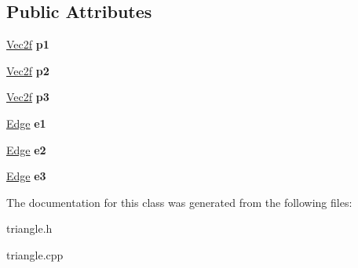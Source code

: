 \subsection*{Public Attributes}
\begin{DoxyCompactItemize}
\item 
\hyperlink{class_vector2}{Vec2f} {\bfseries p1}\hypertarget{class_triangle_af2ff757f1bff3177e1a0e8c19664edbc}{}\label{class_triangle_af2ff757f1bff3177e1a0e8c19664edbc}

\item 
\hyperlink{class_vector2}{Vec2f} {\bfseries p2}\hypertarget{class_triangle_a6a7d000238fb26c47181de1e7a502037}{}\label{class_triangle_a6a7d000238fb26c47181de1e7a502037}

\item 
\hyperlink{class_vector2}{Vec2f} {\bfseries p3}\hypertarget{class_triangle_a43b6750934c84aff2f34b38d2f26d012}{}\label{class_triangle_a43b6750934c84aff2f34b38d2f26d012}

\item 
\hyperlink{class_edge}{Edge} {\bfseries e1}\hypertarget{class_triangle_ab91aa48d8a4c25deecd1a35433a38260}{}\label{class_triangle_ab91aa48d8a4c25deecd1a35433a38260}

\item 
\hyperlink{class_edge}{Edge} {\bfseries e2}\hypertarget{class_triangle_a5ad4339f6fb03adb4f6ee840ace34d82}{}\label{class_triangle_a5ad4339f6fb03adb4f6ee840ace34d82}

\item 
\hyperlink{class_edge}{Edge} {\bfseries e3}\hypertarget{class_triangle_aa55fc8f8662cba36b227858760bb173c}{}\label{class_triangle_aa55fc8f8662cba36b227858760bb173c}

\end{DoxyCompactItemize}


The documentation for this class was generated from the following files\+:\begin{DoxyCompactItemize}
\item 
triangle.\+h\item 
triangle.\+cpp\end{DoxyCompactItemize}
